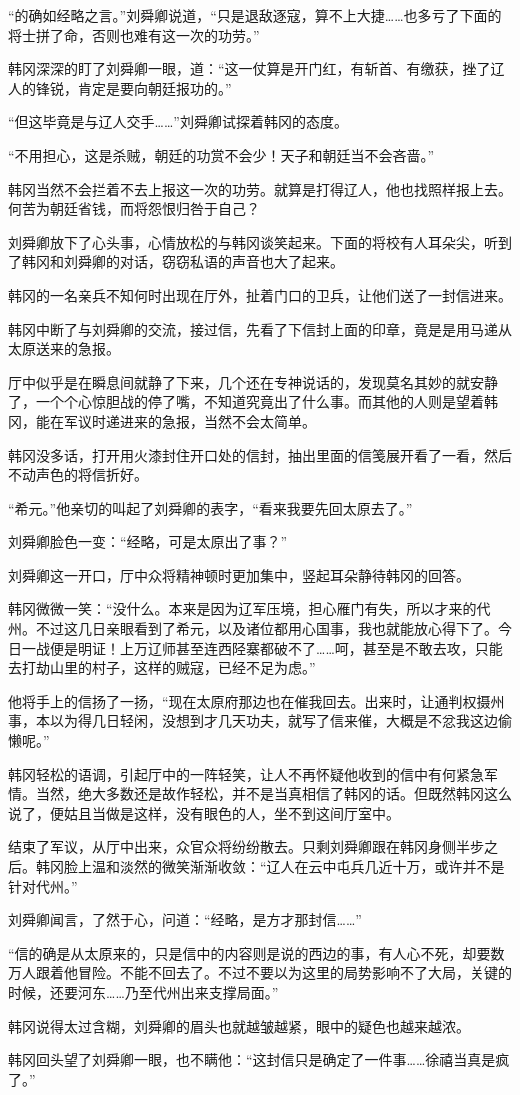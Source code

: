 “的确如经略之言。”刘舜卿说道，“只是退敌逐寇，算不上大捷……也多亏了下面的将士拼了命，否则也难有这一次的功劳。”

韩冈深深的盯了刘舜卿一眼，道：“这一仗算是开门红，有斩首、有缴获，挫了辽人的锋锐，肯定是要向朝廷报功的。”

“但这毕竟是与辽人交手……”刘舜卿试探着韩冈的态度。

“不用担心，这是杀贼，朝廷的功赏不会少！天子和朝廷当不会吝啬。”

韩冈当然不会拦着不去上报这一次的功劳。就算是打得辽人，他也找照样报上去。何苦为朝廷省钱，而将怨恨归咎于自己？

刘舜卿放下了心头事，心情放松的与韩冈谈笑起来。下面的将校有人耳朵尖，听到了韩冈和刘舜卿的对话，窃窃私语的声音也大了起来。

韩冈的一名亲兵不知何时出现在厅外，扯着门口的卫兵，让他们送了一封信进来。

韩冈中断了与刘舜卿的交流，接过信，先看了下信封上面的印章，竟是是用马递从太原送来的急报。

厅中似乎是在瞬息间就静了下来，几个还在专神说话的，发现莫名其妙的就安静了，一个个心惊胆战的停了嘴，不知道究竟出了什么事。而其他的人则是望着韩冈，能在军议时递进来的急报，当然不会太简单。

韩冈没多话，打开用火漆封住开口处的信封，抽出里面的信笺展开看了一看，然后不动声色的将信折好。

“希元。”他亲切的叫起了刘舜卿的表字，“看来我要先回太原去了。”

刘舜卿脸色一变：“经略，可是太原出了事？”

刘舜卿这一开口，厅中众将精神顿时更加集中，竖起耳朵静待韩冈的回答。

韩冈微微一笑：“没什么。本来是因为辽军压境，担心雁门有失，所以才来的代州。不过这几日亲眼看到了希元，以及诸位都用心国事，我也就能放心得下了。今日一战便是明证！上万辽师甚至连西陉寨都破不了……呵，甚至是不敢去攻，只能去打劫山里的村子，这样的贼寇，已经不足为虑。”

他将手上的信扬了一扬，“现在太原府那边也在催我回去。出来时，让通判权摄州事，本以为得几日轻闲，没想到才几天功夫，就写了信来催，大概是不忿我这边偷懒呢。”

韩冈轻松的语调，引起厅中的一阵轻笑，让人不再怀疑他收到的信中有何紧急军情。当然，绝大多数还是故作轻松，并不是当真相信了韩冈的话。但既然韩冈这么说了，便姑且当做是这样，没有眼色的人，坐不到这间厅室中。

结束了军议，从厅中出来，众官众将纷纷散去。只剩刘舜卿跟在韩冈身侧半步之后。韩冈脸上温和淡然的微笑渐渐收敛：“辽人在云中屯兵几近十万，或许并不是针对代州。”

刘舜卿闻言，了然于心，问道：“经略，是方才那封信……”

“信的确是从太原来的，只是信中的内容则是说的西边的事，有人心不死，却要数万人跟着他冒险。不能不回去了。不过不要以为这里的局势影响不了大局，关键的时候，还要河东……乃至代州出来支撑局面。”

韩冈说得太过含糊，刘舜卿的眉头也就越皱越紧，眼中的疑色也越来越浓。

韩冈回头望了刘舜卿一眼，也不瞒他：“这封信只是确定了一件事……徐禧当真是疯了。”

